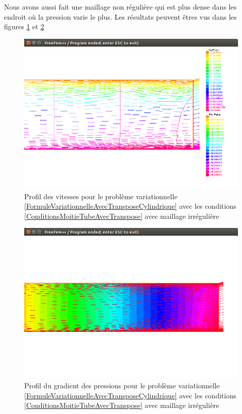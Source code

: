 \documentclass[11pt,a4paper]{article}
\numberwithin{equation}{subsection}
\numberwithin{figure}{subsection}
\begin{document}
Nous avons aussi fait une maillage non régulière qui est plus dense dans les endroit où la pression varie le plus. Les résultats peuvent êtres vus dans les figures \ref{StokesLimitesVitessesCylindriqueIrregulier} et \ref{StokesLimitesPressionCylindriqueIrregulier}

\begin{figure}
\centering
\includegraphics[scale=0.4]{StokesLimitesVitessesCylindriqueIrregulier.png}
\caption{Profil des vitesses pour le problème variationnelle \ref{FormuleVariationnelleAvecTransposeCylindrique} avec les conditions \ref{ConditionsMoitieTubeAvecTranspose} avec maillage irrégulière}
\label{StokesLimitesVitessesCylindriqueIrregulier}
\end{figure}

\begin{figure}
\centering
\includegraphics[scale=0.4]{StokesLimitesPressionCylindriqueIrregulier.png}
\caption{Profil du gradient des pressions pour le problème variationnelle \ref{FormuleVariationnelleAvecTransposeCylindrique} avec les conditions \ref{ConditionsMoitieTubeAvecTranspose} avec maillage irrégulière}
\label{StokesLimitesPressionCylindriqueIrregulier}
\end{figure}
\end{document}
